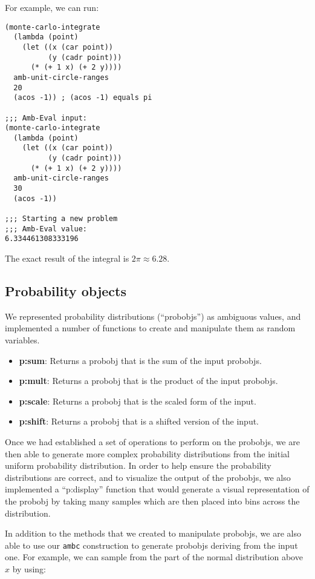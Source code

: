 \documentclass{article}
\begin{document}
For example, we can run:
\begin{lstlisting}
(monte-carlo-integrate
  (lambda (point)
    (let ((x (car point))
          (y (cadr point)))
      (* (+ 1 x) (+ 2 y))))
  amb-unit-circle-ranges
  20
  (acos -1)) ; (acos -1) equals pi

;;; Amb-Eval input:
(monte-carlo-integrate
  (lambda (point)
    (let ((x (car point))
          (y (cadr point)))
      (* (+ 1 x) (+ 2 y))))
  amb-unit-circle-ranges
  30
  (acos -1))

;;; Starting a new problem
;;; Amb-Eval value:
6.334461308333196
\end{lstlisting}
The exact result of the integral is $2\pi \approx 6.28$.

\subsection{Probability objects}

We represented probability distributions (``probobjs'') as ambiguous
values, and implemented a number of functions to create and manipulate
them as random variables.
\begin{itemize}
  \item \textbf{p:sum}: Returns a {probobj} that is the sum of the input
{probobj}s.
  \item \textbf{p:mult}: Returns a {probobj} that is the product of the
input {probobj}s.
  \item \textbf{p:scale}: Returns a {probobj} that is the scaled form of
the input.
  \item \textbf{p:shift}: Returns a {probobj} that is a shifted version
of the input.
\end{itemize}

Once we had established a set of operations to perform on the
{probobj}s, we are then able to generate more complex probability
distributions from the initial uniform probability distribution. In order to
help ensure the probability distributions are correct, and to visualize the
output of the {probobj}s, we also implemented a ``p:display'' function
that would generate a visual representation of the {probobj} by taking
many samples which are then placed into bins across the distribution.

In addition to the methods that we created to manipulate {probobj}s, we
are also able to use our \texttt{ambc} construction to generate
{probobj}s deriving from the input one. For example, we can sample from
the part of the normal distribution above $x$ by using:
\end{document}
